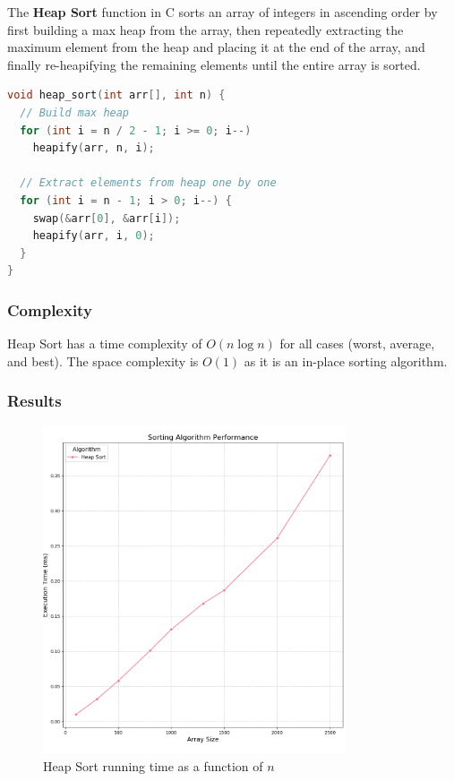 \documentclass{article}
\begin{document}
The \textbf{Heap Sort} function in C sorts an array of integers in ascending order by first building a max heap from the array, then repeatedly extracting the maximum element from the heap and placing it at the end of the array, and finally re-heapifying the remaining elements until the entire array is sorted.

\begin{lstlisting}[language=C, caption=Heap Sort implementation]
void heap_sort(int arr[], int n) {
  // Build max heap
  for (int i = n / 2 - 1; i >= 0; i--)
    heapify(arr, n, i);

  // Extract elements from heap one by one
  for (int i = n - 1; i > 0; i--) {
    swap(&arr[0], &arr[i]);
    heapify(arr, i, 0);
  }
}
\end{lstlisting}

\subsubsection{Complexity}
Heap Sort has a time complexity of $O(n \log n)$ for all cases (worst, average, and best). The space complexity is $O(1)$ as it is an in-place sorting algorithm.

\subsubsection{Results}
\begin{figure}[H]
	\includegraphics[width=0.8\textwidth]{images/heap_sort.png}
	\caption{Heap Sort running time as a function of $n$}
\end{figure}
\end{document}
